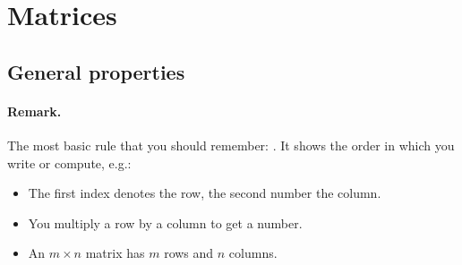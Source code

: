 \documentclass[11pt]{article}
\begin{document}
\newpage

\section{Matrices}
\subsection{General properties}
\paragraph{Remark.} The most basic rule that you should remember:
. It shows the order in which you write or compute, e.g.:
\begin{itemize}
    \item The first index denotes the row, the second number the column.
    \item You multiply a row by a column to get a number.
    \item An $m \times n$ matrix has $m$ rows and $n$ columns.
\end{itemize}
\vskip 30pt
\end{document}
